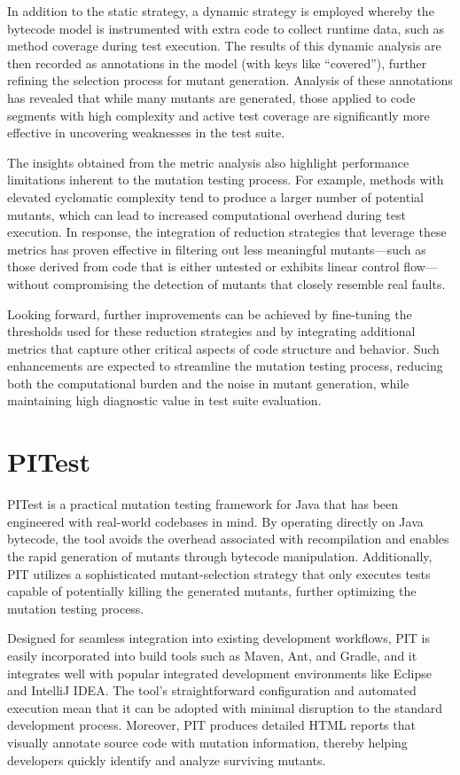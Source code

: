 \documentclass[sigplan, nonacm]{acmart}
\begin{document}
In addition to the static strategy, a dynamic strategy is employed whereby the bytecode model is instrumented with extra code to collect runtime data, such as method coverage during test execution. The results of this dynamic analysis are then recorded as annotations in the model (with keys like “covered”), further refining the selection process for mutant generation. Analysis of these annotations has revealed that while many mutants are generated, those applied to code segments with high complexity and active test coverage are significantly more effective in uncovering weaknesses in the test suite.

The insights obtained from the metric analysis also highlight performance limitations inherent to the mutation testing process. For example, methods with elevated cyclomatic complexity tend to produce a larger number of potential mutants, which can lead to increased computational overhead during test execution. In response, the integration of reduction strategies that leverage these metrics has proven effective in filtering out less meaningful mutants—such as those derived from code that is either untested or exhibits linear control flow—without compromising the detection of mutants that closely resemble real faults.

Looking forward, further improvements can be achieved by fine-tuning the thresholds used for these reduction strategies and by integrating additional metrics that capture other critical aspects of code structure and behavior. Such enhancements are expected to streamline the mutation testing process, reducing both the computational burden and the noise in mutant generation, while maintaining high diagnostic value in test suite evaluation.

\section{PITest}

PITest is a practical mutation testing framework for Java that has been engineered with real-world codebases in mind. By operating directly on Java bytecode, the tool avoids the overhead associated with recompilation and enables the rapid generation of mutants through bytecode manipulation. Additionally, PIT utilizes a sophisticated mutant-selection strategy that only executes tests capable of potentially killing the generated mutants, further optimizing the mutation testing process.

Designed for seamless integration into existing development workflows, PIT is easily incorporated into build tools such as Maven, Ant, and Gradle, and it integrates well with popular integrated development environments like Eclipse and IntelliJ IDEA. The tool’s straightforward configuration and automated execution mean that it can be adopted with minimal disruption to the standard development process. Moreover, PIT produces detailed HTML reports that visually annotate source code with mutation information, thereby helping developers quickly identify and analyze surviving mutants.
\end{document}
